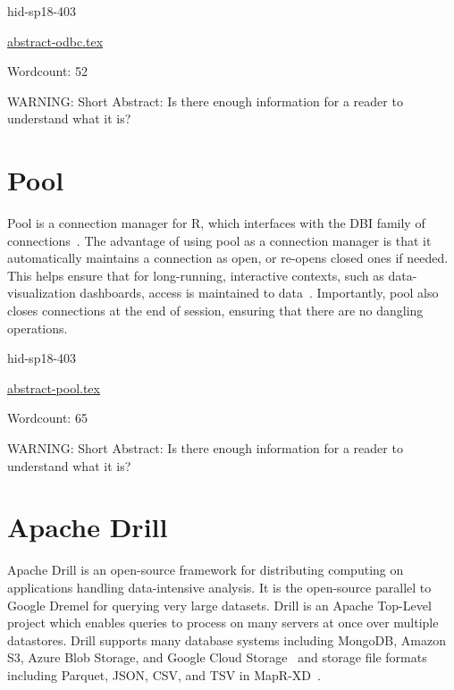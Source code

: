 \begin{IU}

hid-sp18-403

\href{https://github.com/cloudmesh-community/hid-sp18-403/blob/master//technology/abstract-odbc.tex}{abstract-odbc.tex}

 

Wordcount: 52

WARNING: Short Abstract: Is there enough information for a reader to understand what it is?

\end{IU}

\section{Pool}

Pool is a connection manager for R, which interfaces with the DBI
family of connections~\cite{hid-sp18-403-R-dbi}. The advantage of
using pool as a connection manager is that it automatically maintains
a connection as open, or re-opens closed ones if needed. This helps
ensure that for long-running, interactive contexts, such as
data-visualization dashboards, access is maintained to
data~\cite{hid-sp18-403-R-pool}. Importantly, pool also closes
connections at the end of session, ensuring that there are no dangling
operations.


\begin{IU}

hid-sp18-403

\href{https://github.com/cloudmesh-community/hid-sp18-403/blob/master//technology/abstract-pool.tex}{abstract-pool.tex}

 

Wordcount: 65

WARNING: Short Abstract: Is there enough information for a reader to understand what it is?

\end{IU}

\section{Apache Drill}

Apache Drill is an open-source framework for distributing 
computing on applications handling data-intensive analysis. 
It is the open-source parallel to Google Dremel for querying 
very large datasets. Drill is an Apache Top-Level~\cite{hid-sp18-404-BlogsApache2014} 
project which enables queries to process on many servers at once 
over multiple datastores. Drill supports many database systems 
including MongoDB, Amazon S3, Azure Blob Storage, and Google 
Cloud Storage~\cite{hid-sp18-404-Drill2015} and storage file 
formats including Parquet, JSON, CSV, and TSV in MapR-XD~\cite{hid-sp18-404-Drill2017}.

